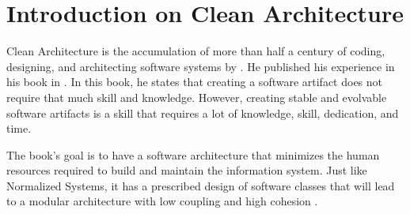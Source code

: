 \section{Introduction on Clean Architecture} \label{sec:into_ca}

Clean Architecture is the accumulation of more than half a century of coding, designing,
and architecting software systems by \citeauthor*[]{robert_c_martin_clean_2018}. He published his
experience in his book  in \citeyear[]{robert_c_martin_clean_2018}.
In this book, he states that creating a software artifact does not require that much skill
and knowledge. However, creating stable and evolvable software artifacts is a skill that
requires a lot of knowledge, skill, dedication, and time.

The book's goal is to have a software architecture that minimizes the human resources
required to build and maintain the information system. Just like Normalized Systems, it
has a prescribed design of software classes that will lead to a modular architecture with
low coupling and high cohesion \parencite{robert_c_martin_clean_2018}.

